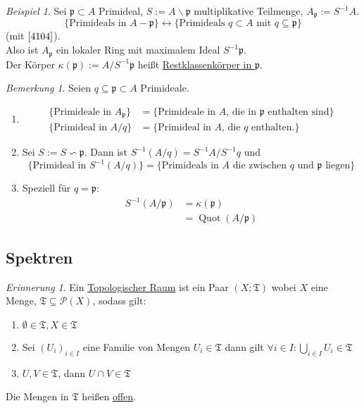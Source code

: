 \documentclass[10pt,a4paper]{article}
\newcommand{\Quot}{\operatorname{Quot}}
\newcounter{thm}[section]
\theoremstyle{definition}
\theoremstyle{plain}
\theoremstyle{remark}
\newtheorem{bem}[thm]{Bemerkung}
\newtheorem{rem}[thm]{Erinnerung}
\newtheorem{exm}[thm]{Beispiel}
\begin{document}
\begin{exm}
	Sei $\mathfrak p\subset A$ Primideal, $S:=A\backslash \mathfrak p$ multiplikative Teilmenge, $A_{\mathfrak p}:=S^{-1}A$.
	\[\{\text{Primideals in $A-\mathfrak p$}\}\leftrightarrow\{\text{Primideals $q\subset A$ mit $q\subseteq \mathfrak p$}\}\]
	(mit $\ref{4104}$).\\ 
	Also ist $A_{\mathfrak p}$ ein lokaler Ring mit maximalem Ideal $S^{-1}\mathfrak p$.\\
	Der Körper $\kappa(\mathfrak p):=A/S^{-1}\mathfrak p$ heißt \underline{Restklassenkörper in $\mathfrak p$}.
\end{exm}

\begin{bem}
	Seien $q\subseteq\mathfrak p\subset A$ Primideale.\begin{enumerate}
		\item \begin{align*}
		\{\text{Primideale in $A_{\mathfrak p}$}\}&=\{\text{Primideale in $A$, die in $\mathfrak p$ enthalten sind}\}\\
		\{\text{Primideal in $A/q$}\}&=\{\text{Primideal in $A$, die $q$ enthalten.}\}
		\end{align*}
		\item  Sei $S:=S\backsim\mathfrak p$. Dann ist $S^{-1}(A/q)=S^{-1} A/S^{-1}q$ und
		\[\{\text{Primideal in $S^{-1}(A/q)$}\}=\{\text{Primideals in $A$ die zwischen $q$ und $\mathfrak p$ liegen}\}\]
		\item Speziell für $q=\mathfrak p$:
		\begin{align*}
		S^{-1}(A/\mathfrak p)&=\kappa(\mathfrak p)\\
		&=\Quot(A/\mathfrak p)
		\end{align*}
	\end{enumerate}
\end{bem}




\subsection{Spektren}
\begin{rem}
	Ein \underline{Topologischer Raum} ist ein Paar $(X;\mathfrak T)$ wobei $X$ eine Menge, $\mathfrak T\subseteq \mathscr P(X)$, sodass gilt:
	\begin{enumerate}
		\item $\emptyset \in\mathfrak T,X\in\mathfrak T$
		\item Sei $(U_i)_{i\in I}$ eine Familie von Mengen $U_i\in\mathfrak T$ dann gilt $\forall i\in I:\bigcup_{i\in I}U_i\in\mathfrak T$
		\item $U,V\in\mathfrak T$, dann $U\cap V\in\mathfrak T$
	\end{enumerate}
Die Mengen in $\mathfrak T$ heißen \underline{offen}.
\end{rem}
\end{document}
